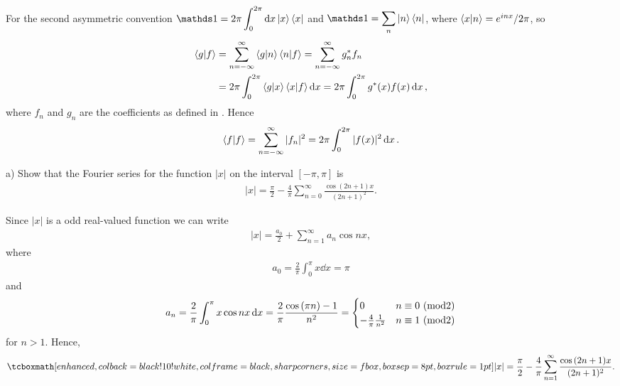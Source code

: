 For the second asymmetric convention $\displaystyle \id = 2\pi \int_{0}^{2\pi} \dd{x} \ket{x}\bra{x}$ and $\displaystyle \id = \sum_{n} \ket{n}\bra{n}$, where $\bra{x}\ket{n} = e^{inx}/2\pi$, so
\begin{align}
    \label{eq:second-convention}
    \bra{g}\ket{f} &= \sum_{n=-\infty}^{\infty} \bra{g}\ket{n}\bra{n}\ket{f} = \sum_{n=-\infty}^{\infty} g_{n}^{*} f_{n} \\
                   &= 2\pi \int_{0}^{2\pi} \bra{g}\ket{x} \bra{x}\ket{f} \dd{x} = 2\pi \int_{0}^{2\pi} g^{*}(x)f(x) \dd{x}
,\end{align}
where $f_{n}$ and $g_{n}$ are the coefficients as defined in .
Hence
\begin{align}
    \label{eq:f-f-2} 
    \bra{f}\ket{f} = \sum_{n=-\infty}^{\infty} |f_{n}|^2 = 2\pi \int_{0}^{2\pi} |f(x)|^2 \dd{x}
.\end{align}






a) Show that the Fourier series for the function $|x|$ on the interval $[-\pi,\pi]$ is 
\begin{eqnarray}
    \label{eq:|x|-fourier}
    |x| = \frac{\pi}{2} - \frac{4}{\pi}\sum_{n=0}^{\infty} \frac{\cos{(2n+1)x}}{(2n+1)^2}
.\end{eqnarray}

Since $|x|$ is a odd real-valued function we can write 
\begin{eqnarray}
    \label{eq:|x|-fourier-1}
    |x| = \frac{a_0}{2} + \sum_{n=1}^{\infty} a_{n}\cos{nx} 
,\end{eqnarray}
where
\begin{eqnarray}
    \label{eq:a0}
    a_0 = \frac{2}{\pi}\int_{0}^{\pi} x \dd{x} = \pi
\end{eqnarray}
and
\begin{eqnarray}
    \label{eq:an-bn}
    a_{n} = \frac{2}{\pi} \int_{0}^{\pi} x\cos{nx} \dd{x} = \frac{2}{\pi}\frac{\cos{(\pi n)} - 1}{n^2} = 
    \begin{cases}
        0 & n \equiv 0 ~ ({\rm mod} 2) \\
        -\frac{4}{\pi}\frac{1}{n^2} & n \equiv 1 ~ ({\rm mod} 2)
    \end{cases}
\end{eqnarray}
for $n > 1$.
Hence, 
\begin{eqnarray}
    \label{eq:|x|-fourier-2}
    \eqbox{
    |x| = \frac{\pi}{2} - \frac{4}{\pi} \sum_{n=1}^{\infty} \frac{ \cos{(2n+1)x} }{(2n+1)^2}
}
.\end{eqnarray}


